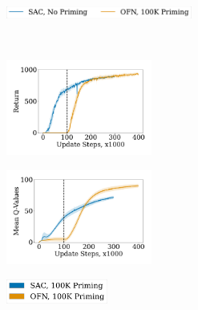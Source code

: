 \begin{figure}[t]
\begin{minipage}[t]{.60\textwidth}
\centering
    \begin{subfigure}[b]{\textwidth}
        \centering
        \includegraphics[height=0.4cm]{figures/dissecting/priming/priming_norm_return_legend.pdf}
    \end{subfigure}\\%
    \begin{subfigure}[b]{0.5\textwidth}
        \centering
        \includegraphics[width=4.8cm]{figures/dissecting/priming/priming_norm_return.pdf}
        \label{subfig:overestimation:priming_norm_ret}
    \end{subfigure}%
    \begin{subfigure}[b]{0.5\textwidth}
        \centering
        \includegraphics[width=4.8cm]{figures/dissecting/priming/priming_norm_Q.pdf}
        \label{subfig:overestimation:priming_norm_Q}
    \end{subfigure}%
    \caption{(Left) Return and (Right) Q-values comparing SGD result and OFN when priming for 100K steps. OFN obtains returns close to that of the well-trained SGD agent and learns an appropriate Q-value scale correctly.}
    \label{fig:overestimation:priming_norm}
\end{minipage}
\hfill
\begin{minipage}[t]{.36\textwidth}
\centering
    \begin{subfigure}[b]{\textwidth}
        \centering
        \includegraphics[height=0.8cm]{figures/dissecting/priming/weight_magnitudes_legend.pdf}

\end{subfigure}
\end{minipage}
\end{figure}
